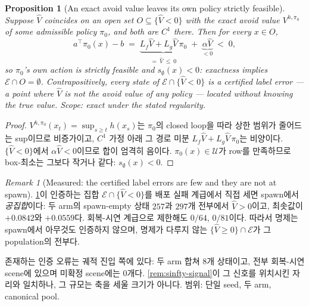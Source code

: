 \documentclass[11pt]{article}
\theoremstyle{plain}
\newtheorem{proposition}[theorem]{Proposition}
\theoremstyle{definition}
\theoremstyle{remark}
\newtheorem{remark}[theorem]{Remark}
\newcommand{\calU}{\mathcal{U}}
\newcommand{\Vhp}[1]{V^{h,#1}}
\newcommand{\Vhat}{\widehat V}
\newcommand{\Lg}{L_g}
\newcommand{\Lf}{L_f}
\begin{document}
\begin{proposition}[An exact avoid value leaves its own policy strictly feasible]\label{prop:exact-value-feasible}
Suppose $\Vhat$ coincides on an open set $O\subseteq\{\Vhat<0\}$ with the exact avoid value
$\Vhp{\pi_0}$ of some admissible policy $\pi_0$, and both are $C^1$ there. Then for every
$x\in O$,
\[
  a^\top\pi_0(x)-b\;=\;\underbrace{\Lf\Vhat+\Lg\Vhat\,\pi_0}_{=\ \dot{\Vhat}\ \le\ 0}
  \;+\;\underbrace{\alpha\Vhat}_{<0}\;<\;0,
\]
so $\pi_0$'s own action is strictly feasible and $s_\emptyset(x)<0$: exactness implies
$\mathcal E\cap O=\emptyset$. Contrapositively, every state of
$\mathcal E\cap\{\Vhat<0\}$ is a \emph{certified} label error --- a point where $\Vhat$ is
not the avoid value of any policy --- located without knowing the true value.
Scope: exact under the stated regularity.
\end{proposition}
\begin{proof}
$\Vhp{\pi_0}(x_t)=\sup_{s\ge t}h(x_s)$는 $\pi_0$의 closed loop을 따라 상한 범위가 줄어드는
sup이므로 비증가이고, $C^1$ 가정 아래 그 경로 미분 $\Lf\Vhat+\Lg\Vhat\,\pi_0$는 비양이다.
$\{\Vhat<0\}$에서 $\alpha\Vhat<0$이므로 합이 엄격히 음이다. $\pi_0(x)\in\calU$가 row를
만족하므로 box-최소는 그보다 작거나 같다: $s_\emptyset(x)<0$.
\end{proof}

\begin{remark}[Measured: the certified label errors are few and they are not at spawn]\label{rem:label-error-measured}
\cref{prop:exact-value-feasible}이 인증하는 집합 $\mathcal E\cap\{\Vhat<0\}$를 배포 실패 계급에서
직접 세면 spawn에서 \emph{공집합}이다: 두 arm의 spawn-empty 상태 $257$과 $297$개 전부에서
$\Vhat>0$이고, 최솟값이 $+0.0842$와 $+0.0559$다. 회복-시연 계급으로 제한해도 $0/64$, $0/81$이다.
따라서 명제는 spawn에서 아무것도 인증하지 않으며, 명제가 다루지 않는
$\{\Vhat\ge0\}\cap\mathcal E$가 그 population의 전부다.

존재하는 인증 오류는 궤적 진입 쪽에 있다: 두 arm 합쳐 $8$개 상태이고, 전부 회복-시연 scene에
있으며 미확정 scene에는 $0$개다. \cref{rem:sinfty-signal}이 그 신호를 위치시킨 자리와 일치하나,
그 규모는 축을 세울 크기가 아니다. 범위: 단일 seed, 두 arm, canonical pool.
\end{remark}
\end{document}
